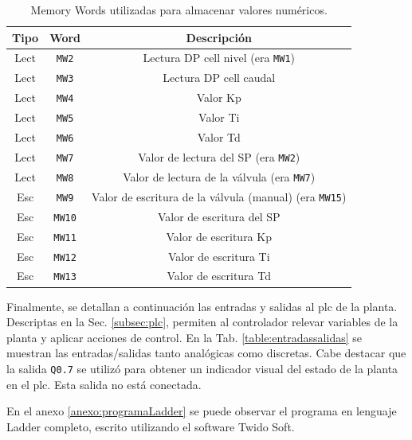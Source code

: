 \begin{table}[!t]

\renewcommand{\arraystretch}{1.3}
\centering
\begin{tabular}{c||c||c}
\hline
\bfseries Tipo & \bfseries Word  & \bfseries Descripción\\
\hline \hline
Lect & \verb|MW2|  & Lectura DP cell nivel (era \verb|MW1|)\\
Lect & \verb|MW3|  & Lectura DP cell caudal\\
Lect & \verb|MW4|  & Valor Kp\\
Lect & \verb|MW5|  & Valor Ti\\
Lect & \verb|MW6|  & Valor Td\\
Lect & \verb|MW7|  & Valor de lectura del SP (era \verb|MW2|)\\
Lect & \verb|MW8|  & Valor de lectura de la válvula (era \verb|MW7|)\\
\hline
Esc & \verb|MW9| & Valor de escritura de la válvula (manual) (era 
\verb|MW15|) \\
Esc & \verb|MW10|  & Valor de escritura del SP \\
Esc & \verb|MW11|  & Valor de escritura Kp \\
Esc & \verb|MW12|  & Valor de escritura Ti \\
Esc & \verb|MW13| & Valor de escritura Td \\
\hline
\end{tabular}
\caption{Memory Words utilizadas para almacenar valores numéricos.}
\label{table:mwNumericos}
\end{table}

Finalmente, se detallan a continuación las entradas y salidas al \gls{plc} de 
la planta.
Descriptas en la Sec. \ref{subsec:plc}, permiten al
controlador relevar variables de la planta y aplicar acciones de control. 
En la Tab. \ref{table:entradassalidas} se muestran las
entradas/salidas tanto analógicas como discretas.
Cabe destacar que la salida \verb|Q0.7| se utilizó para obtener un indicador
visual del estado de la planta en el \gls{plc}.
Esta salida no está conectada.

En el anexo \ref{anexo:programaLadder} se puede
observar el programa en
lenguaje Ladder completo, escrito utilizando el software Twido Soft.

